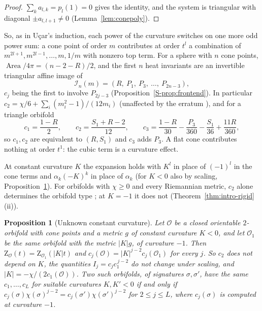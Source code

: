 \documentclass[pdflatex,sn-mathphys-num]{sn-jnl}
\theoremstyle{thmstyleone}%
\newtheorem{proposition}[theorem]{Proposition}%
\theoremstyle{thmstylethree}%
\newcommand{\Orb}{\mathcal{O}}
\newcommand{\Area}{\operatorname{Area}}
\newcommand{\cI}{\mathcal{I}}
\newcommand{\cZ}{\mathrm{Z}}
\newcommand{\sref}[1]{\ref*{S-#1}}%
\begin{document}
\begin{proof}
$\sum_ka_{l,k}=p_l(1)=0$ gives the identity, and the system is triangular with diagonal $\pm a_{l,l+1}\ne0$ (Lemma~\ref{lem:conepoly}).
\end{proof}

So, as in U\c{c}ar's induction, each power of the curvature switches on one more odd power sum: a cone point of order $m$ contributes at order $t^l$ a combination of $m^{2l+1},m^{2l-1},\dots,m,1/m$ with nonzero top term. For a sphere with $n$ cone points, $\Area/4\pi=(n-2-R)/2$, and the first $n$ heat invariants are an invertible triangular affine image of
\begin{equation}\label{eq:In}
  \cI_n(m)=(R,\ P_1,\ P_3,\ \dots,\ P_{2n-3}),
\end{equation}
$c_j$ being the first to involve $P_{2j-3}$ (Proposition~\sref{prop:frontend}). In particular $c_2=\chi/6+\sum_i(m_i^2-1)/(12m_i)$ \cite[Ex.~5.3, Prop.~5.5, Ex.~5.6, (5.7)]{dggw2008} (unaffected by the erratum \cite{dggw2017erratum}), and for a triangle orbifold
\begin{equation}\label{eq:s1inv}
  c_1=\frac{1-R}2,\qquad c_2=\frac{S_1+R-2}{12},\qquad c_3=\frac{1-R}{30}-\frac{P_3}{360}-\frac{S_1}{36}+\frac{11R}{360},
\end{equation}
so $c_1,c_2$ are equivalent to $(R,S_1)$ and $c_3$ adds $P_3$. A flat cone contributes nothing at order $t^1$: the cubic term is a curvature effect.

At constant curvature $K$ the expansion holds with $K^l$ in place of $(-1)^l$ in the cone terms and $\alpha_k(-K)^k$ in place of $\alpha_k$ \cite[Thm~4.20]{ucar2017} (for $K<0$ also by scaling, Proposition~\ref{prop:unknownK}). For orbifolds with $\chi\ge0$ and every Riemannian metric, $c_2$ alone determines the orbifold type \cite[(5.13), Thms~5.14--5.15]{dggw2008}; at $K=-1$ it does not (Theorem~\ref{thm:intro-rigid}(ii)).

\begin{proposition}[Unknown constant curvature]\label{prop:unknownK}
Let $\Orb$ be a closed orientable $2$-orbifold with cone points and a metric $g$ of constant curvature $K<0$, and let $\Orb_1$ be the same orbifold with the metric $|K|g$, of curvature $-1$. Then $\cZ_\Orb(t)=\cZ_{\Orb_1}(|K|t)$ and $c_j(\Orb)=|K|^{j-2}c_j(\Orb_1)$ for every $j$. So $c_2$ does not depend on $K$, the quantities $I_j=c_jc_1^{\,j-2}$ do not change under scaling, and $|K|=-\chi/(2c_1(\Orb))$. Two such orbifolds, of signatures $\sigma,\sigma'$, have the same $c_1,\dots,c_L$ for suitable curvatures $K,K'<0$ if and only if $c_j(\sigma)\chi(\sigma)^{j-2}=c_j(\sigma')\chi(\sigma')^{j-2}$ for $2\le j\le L$, where $c_j(\sigma)$ is computed at curvature $-1$.
\end{proposition}
\end{document}
